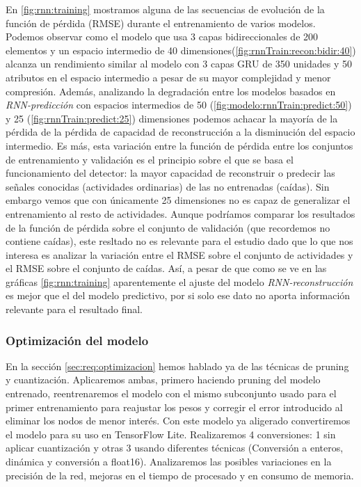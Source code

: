 En \autoref{fig:rnn:training} mostramos alguna de las secuencias de evolución de la función de pérdida (RMSE) durante el entrenamiento de varios modelos. Podemos observar como el modelo que usa 3 capas bidireccionales de 200 elementos y un espacio intermedio de 40 dimensiones(\autoref{fig:rnnTrain:recon:bidir:40}) alcanza un rendimiento similar al modelo con 3 capas GRU de 350 unidades y 50 atributos en el espacio intermedio a pesar de su mayor complejidad y menor compresión. Además, analizando la degradación entre los modelos basados en \textit{RNN-predicción} con espacios intermedios de 50 (\autoref{fig:modelo:rnnTrain:predict:50}) y 25 (\autoref{fig:rnnTrain:predict:25}) dimensiones podemos achacar la mayoría de la pérdida de la pérdida de capacidad de reconstrucción a la disminución del espacio intermedio. Es más, esta variación entre la función de pérdida entre los conjuntos de entrenamiento y validación es el principio sobre el que se basa el funcionamiento del detector: la mayor capacidad de reconstruir o predecir las señales conocidas (actividades ordinarias) de las no entrenadas (caídas). Sin embargo vemos que con únicamente 25 dimensiones no es capaz de generalizar el entrenamiento al resto de actividades.
Aunque podríamos comparar los resultados de la función de pérdida sobre el conjunto de validación (que recordemos no contiene caídas), este resltado no es relevante para el estudio dado que lo que nos interesa es analizar la variación entre el RMSE sobre el conjunto de actividades y el RMSE sobre el conjunto de caídas. Así, a pesar de que como se ve en las gráficas \ref{fig:rnn:training} aparentemente el ajuste del modelo \textit{RNN-reconstrucción} es mejor que el del modelo predictivo, por si solo ese dato no aporta información relevante para el resultado final.

\subsubsection{Optimización del modelo}

En la sección \ref{sec:req:optimizacion} hemos hablado ya de las técnicas de pruning y cuantización. Aplicaremos ambas, primero haciendo pruning del modelo entrenado, reentrenaremos el modelo con el mismo subconjunto usado para el primer entrenamiento para reajustar los pesos y corregir el error introducido al eliminar los nodos de menor interés. Con este modelo ya aligerado convertiremos el modelo para su uso en TensorFlow Lite. Realizaremos 4 conversiones: 1 sin aplicar cuantización y otras 3 usando diferentes técnicas (Conversión a enteros, dinámica y conversión a float16). Analizaremos las posibles variaciones en la precisión de la red, mejoras en el tiempo de procesado y en consumo de memoria.

